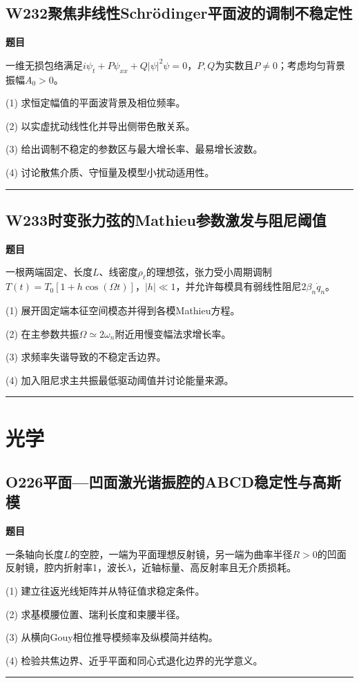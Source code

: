 \documentclass[UTF8,a4paper,11pt,oneside,openany]{ctexbook}
\begin{document}
\section*{W232\quad 聚焦非线性Schrödinger平面波的调制不稳定性}
\textbf{题目}\par
一维无损包络满足$i\psi_t+P\psi_{xx}+Q|\psi|^2\psi=0$，$P,Q$为实数且$P\ne0$；考虑均匀背景振幅$A_0>0$。
\par\smallskip\noindent (1) 求恒定幅值的平面波背景及相位频率。
\par\smallskip\noindent (2) 以实虚扰动线性化并导出侧带色散关系。
\par\smallskip\noindent (3) 给出调制不稳定的参数区与最大增长率、最易增长波数。
\par\smallskip\noindent (4) 讨论散焦介质、守恒量及模型小扰动适用性。
\par\medskip\hrule\medskip
\section*{W233\quad 时变张力弦的Mathieu参数激发与阻尼阈值}
\textbf{题目}\par
一根两端固定、长度$L$、线密度$\rho_\ell$的理想弦，张力受小周期调制$T(t)=T_0[1+h\cos(\Omega t)]$，$|h|\ll1$，并允许每模具有弱线性阻尼$2\beta_n\dot q_n$。
\par\smallskip\noindent (1) 展开固定端本征空间模态并得到各模Mathieu方程。
\par\smallskip\noindent (2) 在主参数共振$\Omega\simeq2\omega_n$附近用慢变幅法求增长率。
\par\smallskip\noindent (3) 求频率失谐导致的不稳定舌边界。
\par\smallskip\noindent (4) 加入阻尼求主共振最低驱动阈值并讨论能量来源。
\par\medskip\hrule\medskip
\chapter{光学}
\section*{O226\quad 平面—凹面激光谐振腔的ABCD稳定性与高斯模}
\textbf{题目}\par
一条轴向长度$L$的空腔，一端为平面理想反射镜，另一端为曲率半径$R>0$的凹面反射镜，腔内折射率1，波长$\lambda$，近轴标量、高反射率且无介质损耗。
\par\smallskip\noindent (1) 建立往返光线矩阵并从特征值求稳定条件。
\par\smallskip\noindent (2) 求基模腰位置、瑞利长度和束腰半径。
\par\smallskip\noindent (3) 从横向Gouy相位推导模频率及纵模简并结构。
\par\smallskip\noindent (4) 检验共焦边界、近乎平面和同心式退化边界的光学意义。
\par\medskip\hrule\medskip
\end{document}
